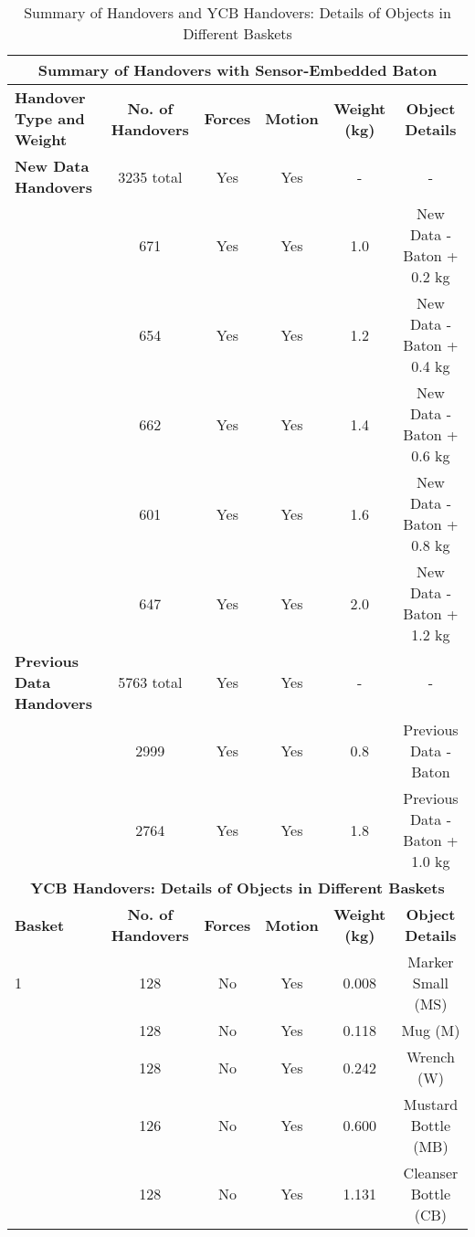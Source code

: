 \begin{table*}[t]
\centering
\caption{Summary of Handovers and YCB Handovers: Details of Objects in Different Baskets}
\begin{tabular}{|l|c|c|c|c|c|}
\hline
\multicolumn{6}{|c|}{\textbf{Summary of Handovers with Sensor-Embedded Baton}} \\ \hline
\textbf{Handover Type and Weight} & \textbf{No. of Handovers} & \textbf{Forces} & \textbf{Motion} & \textbf{Weight (kg)} & \textbf{ Object Details} \\ \hline
\textbf{New Data Handovers} & 3235 total & Yes & Yes & - & - \\ \hline
\hspace{0.5cm}  & 671 & Yes & Yes & 1.0 & New Data - Baton + 0.2 kg\\ 
\hspace{0.5cm}  & 654 & Yes & Yes & 1.2 & New Data - Baton + 0.4 kg \\ 
\hspace{0.5cm}  & 662 & Yes & Yes & 1.4 & New Data - Baton + 0.6 kg \\ 
\hspace{0.5cm}  & 601 & Yes & Yes & 1.6 & New Data - Baton + 0.8 kg \\ 
\hspace{0.5cm}  & 647 & Yes & Yes & 2.0 & New Data - Baton + 1.2 kg \\ \hline
\textbf{Previous Data Handovers} & 5763 total & Yes & Yes & - & - \\ \hline
\hspace{0.5cm}  & 2999 & Yes & Yes & 0.8 & Previous Data - Baton\\ 
\hspace{0.5cm}  & 2764 & Yes & Yes & 1.8 & Previous Data - Baton + 1.0 kg\\ \hline
\multicolumn{6}{|c|}{\textbf{YCB Handovers: Details of Objects in Different Baskets}} \\ \hline
\textbf{Basket} & \textbf{No. of Handovers} & \textbf{Forces} & \textbf{Motion} & \textbf{Weight (kg)} & \textbf{Object Details} \\ \hline
1 & 128 & No & Yes & 0.008 & Marker Small (MS) \\ 
  & 128  & No & Yes & 0.118 & Mug (M) \\ 
  & 128  & No & Yes & 0.242 & Wrench (W) \\ 
  & 126  & No & Yes & 0.600 & Mustard Bottle (MB) \\ 
  & 128  & No & Yes & 1.131 & Cleanser Bottle (CB) \\ \hline

\end{tabular}
\end{table*}
